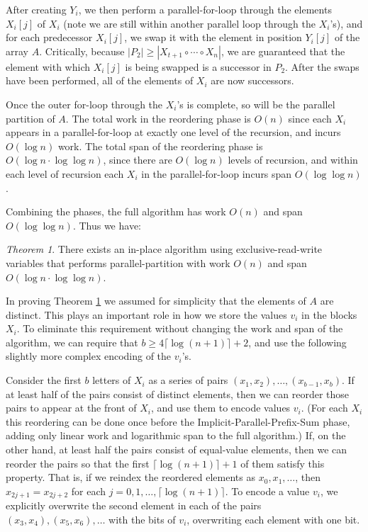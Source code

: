 \documentclass[sigplan, twocolumn]{amsart}
\renewcommand{\paragraph}[1]{\vspace{0.09in}\noindent{\bf \boldmath #1.}}
\theoremstyle{remark}
\newtheorem{theorem}{Theorem}[section]
\theoremstyle{remark}
\begin{document}
After creating $Y_i$, we then perform a parallel-for-loop through the
elements $X_i[j]$ of $X_i$ (note we are still within another parallel
loop through the $X_i$'s), and for each predecessor $X_i[j]$, we swap
it with the element in position $Y_i[j]$ of the array $A$. Critically,
because $|P_2| \ge |X_{t + 1} \circ \cdots \circ X_n|$, we are
guaranteed that the element with which $X_i[j]$ is being swapped is a
successor in $P_2$. After the swaps have been performed, all of the
elements of $X_i$ are now successors.

Once the outer for-loop through the $X_i$'s is complete, so will be
the parallel partition of $A$. The total work in the reordering phase
is $O(n)$ since each $X_i$ appears in a parallel-for-loop at exactly
one level of the recursion, and incurs $O(\log n)$ work. The total
span of the reordering phase is $O(\log n \cdot \log \log n)$, since
there are $O(\log n)$ levels of recursion, and within each level of
recursion each $X_i$ in the parallel-for-loop incurs span $O(\log \log
n)$.

Combining the phases, the full algorithm has work $O(n)$ and span
$O(\log \log n)$. Thus we have:
\begin{theorem}
  There exists an in-place algorithm using exclusive-read-write
  variables that performs parallel-partition with work $O(n)$ and span
  $O(\log n \cdot \log \log n)$.
  \label{thminplace}
\end{theorem}

\paragraph{Allowing for Repeated Elements} In proving Theorem \ref{thminplace} we assumed for simplicity that the elements of $A$ are distinct. This plays an important role in how we store the values $v_i$ in the blocks $X_i$. To eliminate this requirement without changing the work and span of the algorithm, we can require that $b \ge 4 \lceil \log (n + 1) \rceil + 2$, and use the following slightly more complex encoding of the $v_i$'s.

Consider the first $b$ letters of $X_i$ as a series of pairs $(x_1,
x_2), \ldots, (x_{b - 1}, x_b)$. If at least half of the pairs consist
of distinct elements, then we can reorder those pairs to appear at the
front of $X_i$, and use them to encode values $v_i$. (For each $X_i$
this reordering can be done once before the
Implicit-Parallel-Prefix-Sum phase, adding only linear work and
logarithmic span to the full algorithm.) If, on the other hand, at
least half the pairs consist of equal-value elements, then we can
reorder the pairs so that the first $\lceil \log (n + 1) \rceil + 1$
of them satisfy this property. That is, if we reindex the reordered
elements as $x_0,x_1,\ldots$, then $x_{2j + 1} = x_{2j + 2}$ for each $j =
0, 1, \ldots, \lceil \log (n + 1) \rceil$. To encode a value $v_i$,
we explicitly overwrite the second element in each of the pairs
$(x_3, x_4), (x_5, x_6), \ldots$ with the bits of $v_i$, overwriting each
element with one bit.
\end{document}
